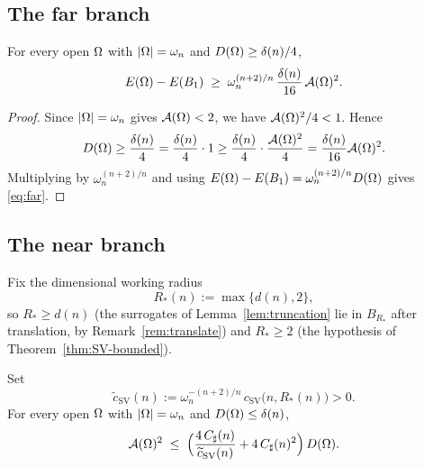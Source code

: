 \subsection{The far branch}\label{ssec:far}

\begin{lemma}\label{lem:far}
For every open $\Omega$ with $\left|\Omega\right|=\omega_n$ and
$D(\Omega)\ge\delta(n)/4$,
\begin{equation}\label{eq:far}
   E(\Omega)-E(B_1)\;\ge\;\omega_n^{(n+2)/n}\,\frac{\delta(n)}{16}\,\mathcal A(\Omega)^2 .
\end{equation}
\end{lemma}

\begin{proof}
Since $\left|\Omega\right|=\omega_n$ gives $\mathcal A(\Omega)<2$, we have
$\mathcal A(\Omega)^2/4<1$. Hence
\[
   D(\Omega)\ge\frac{\delta(n)}{4}
   =\frac{\delta(n)}{4}\cdot1
   \ge\frac{\delta(n)}{4}\cdot\frac{\mathcal A(\Omega)^2}{4}
   =\frac{\delta(n)}{16}\mathcal A(\Omega)^2 .
\]
Multiplying by $\omega_n^{(n+2)/n}$ and using
$E(\Omega)-E(B_1)=\omega_n^{(n+2)/n}D(\Omega)$ gives \eqref{eq:far}.
\end{proof}

\subsection{The near branch}\label{ssec:near}

Fix the dimensional working radius
\begin{equation}\label{eq:Rstar}
   R_*(n):=\max\{d(n),2\},
\end{equation}
so $R_*\ge d(n)$ (the surrogates of Lemma~\ref{lem:truncation} lie in
$B_{R_*}$ after translation, by Remark~\ref{rem:translate}) and
$R_*\ge2$ (the hypothesis of Theorem~\ref{thm:SV-bounded}).

\begin{lemma}\label{lem:near}
Set
\begin{equation}\label{eq:csv-tilde}
   \widetilde c_{\mathrm{SV}}(n)
   :=\omega_n^{-(n+2)/n}\,c_{\mathrm{SV}}\bigl(n,R_*(n)\bigr)>0 .
\end{equation}
For every open $\Omega$ with $\left|\Omega\right|=\omega_n$ and
$D(\Omega)\le\delta(n)$,
\begin{equation}\label{eq:near-Fr}
   \mathcal A(\Omega)^2\;\le\;
   \Bigl(\frac{4\,C_\sharp(n)}{\widetilde c_{\mathrm{SV}}(n)}
        +4\,C_\sharp(n)^2\Bigr)\,D(\Omega).
\end{equation}
\end{lemma}

